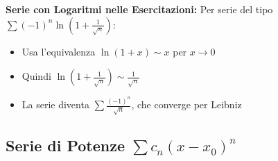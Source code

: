 \begin{info}
\textbf{Serie con Logaritmi nelle Esercitazioni:}
Per serie del tipo $\sum (-1)^n \ln\left(1+\frac{1}{\sqrt{n}}\right)$:
\begin{itemize}
    \item Usa l'equivalenza $\ln(1+x) \sim x$ per $x \to 0$
    \item Quindi $\ln\left(1+\frac{1}{\sqrt{n}}\right) \sim \frac{1}{\sqrt{n}}$
    \item La serie diventa $\sum \frac{(-1)^n}{\sqrt{n}}$, che converge per Leibniz
\end{itemize}
\end{info}

\subsection{Serie di Potenze $\sum c_n (x-x_0)^n$}
